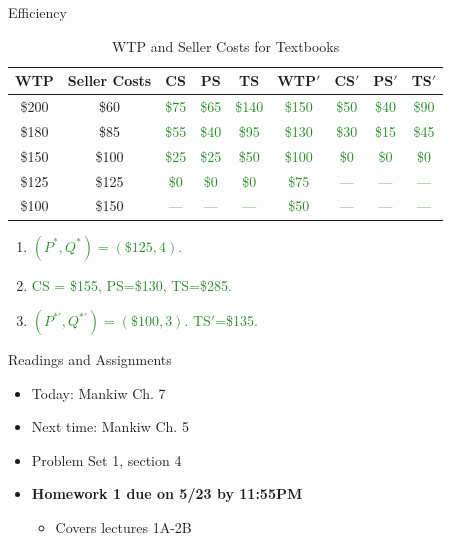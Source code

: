 \documentclass[xcolor={dvipsnames},pdf, hyperref={colorlinks=true, citecolor=ForestGreen, linkcolor=BlueViolet, urlcolor=Magenta}]{beamer}
\newcommand{\ddp}[1]{{\textcolor{ForestGreen}{#1}}}
\begin{document}
\begin{frame}{Efficiency}
		\begin{table}[ht]
			\caption{WTP and Seller Costs for Textbooks}
			\centering
			\begin{tabular}{  c| c |c|c|c||c|c|c |c } 
				
				WTP   & Seller Costs & CS & PS & TS & WTP$'$ & CS$'$ & PS$'$ & TS$'$ \\
				\hline
				\$200 & \$60 & \ddp{\$75} & \ddp{\$65} & \ddp{\$140} & \ddp{\$150} & \ddp{\$50} & \ddp{\$40} & \ddp{\$90}\\
				\$180 & \$85 & \ddp{\$55} & \ddp{\$40} & \ddp{\$95} & \ddp{\$130} & \ddp{\$30} & \ddp{\$15} & \ddp{\$45}\\
				\$150 & \$100 & \ddp{\$25} & \ddp{\$25} & \ddp{\$50} & \ddp{\$100} & \ddp{\$0} & \ddp{\$0} & \ddp{\$0}\\
				\$125 & \$125 & \ddp{\$0} & \ddp{\$0} & \ddp{\$0} & \ddp{\$75} & \ddp{---} & \ddp{---} & \ddp{---}\\
				\$100 & \$150 & \ddp{---} & \ddp{---} & \ddp{---} & \ddp{\$50} & \ddp{---} & \ddp{---} & \ddp{---}\\
			\end{tabular}
			\label{SA3}
		\end{table}
	\begin{enumerate}
	\item \ddp{$(P^*,Q^*) = (\$125,4)$.}
	\item \ddp{CS = \$155, PS=\$130, TS=\$285.}
		\item \ddp{$(P^{*'},Q^{*'}) = (\$100,3)$. TS$'$=\$135.}
	\end{enumerate}
\end{frame}

\begin{frame}{Readings and Assignments}
\begin{itemize}
	\item Today: Mankiw Ch. 7
	\item Next time: Mankiw Ch. 5
	\item Problem Set 1, section 4
	\item \textbf{Homework 1 due on 5/23 by 11:55PM}
		\begin{itemize}
			\item Covers lectures 1A-2B
		\end{itemize}
\end{itemize}
\end{frame}
\end{document}
